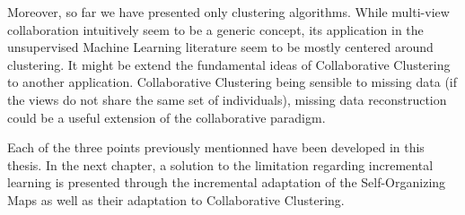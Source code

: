     Moreover, so far we have presented only clustering algorithms. While multi-view collaboration intuitively seem to be a generic concept, its application in the unsupervised Machine Learning literature seem to be mostly centered around clustering. It might be extend the fundamental ideas of Collaborative Clustering to another application. Collaborative Clustering being sensible to missing data (if the views do not share the same set of individuals), missing data reconstruction could be a useful extension of the collaborative paradigm.

    Each of the three points previously mentionned have been developed in this thesis. In the next chapter, a solution to the limitation regarding incremental learning is presented through the incremental adaptation of the Self-Organizing Maps as well as their adaptation to Collaborative Clustering.
